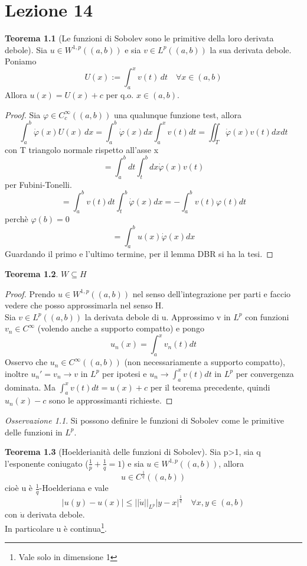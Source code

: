 \documentclass[a4paper]{book}
\theoremstyle{definition}
\theoremstyle{remark}
\newtheorem{oss}{Osservazione}
\theoremstyle{definition}
\newtheorem{teo}{Teorema}
\begin{document}
\chapter{Lezione 14}

\begin{teo}[Le funzioni di Sobolev sono le primitive della loro derivata debole]
	Sia $u\in W^ {1,p}((a,b))$ e sia $v \in L^p((a,b))$ la sua derivata debole. Poniamo $$U(x) := \int_a^x v(t)\,dt \quad \forall x \in (a,b)$$ Allora $u(x) = U(x) + c$ per q.o. $x\in (a,b)$.
\end{teo}

\begin{proof}
	Sia $\varphi \in C_c^\infty ((a,b))$ una qualunque funzione test, allora 
	$$\int_a^b \dot{\varphi}(x)U(x)\,dx = \int_a^b \dot{\varphi}(x) dx\int_a^x v(t)dt = \iint_T \dot{\varphi}(x)v(t)dxdt$$
	con T triangolo normale rispetto all'asse x
	$$ = \int_a^b dt \int_t^b dx \dot{\varphi}(x)v(t)$$ per Fubini-Tonelli.
	$$ = \int_a^bv(t)dt \int_t^b \dot{\varphi}(x)dx = - \int_a^b v(t)\varphi(t)dt$$
	perchè $\varphi(b) = 0$
	$$= \int_a^b u(x) \dot{\varphi}(x) dx$$
	Guardando il primo e l'ultimo termine, per il lemma DBR si ha la tesi.
\end{proof}

\begin{teo}
	$W \subseteq H$
\end{teo}

\begin{proof}
	Prendo $u\in W^ {1,p}((a,b))$ nel senso dell'integrazione per parti e faccio vedere che posso approssimarla nel senso H.\\
	Sia $v \in L^p((a,b))$ la derivata debole di u. Approssimo v in $L^p$ con funzioni $v_n \in C^\infty$ (volendo anche a supporto compatto) e pongo
	$$u_n(x) = \int_a^x v_n(t)dt$$
	Osservo che $u_n \in C^\infty((a,b))$ (non necessariamente a supporto compatto), inoltre $u_n' = v_n \to v$ in $L^p$ per ipotesi e $u_n \to \int_a^x v(t)dt$ in $L^p$ per convergenza dominata. Ma $\int_a^x v(t)dt = u(x) + c$ per il teorema precedente, quindi $u_n(x)-c$ sono le approssimanti richieste. 
\end{proof}

\begin{oss}
	Si possono definire le funzioni di Sobolev come le primitive delle funzioni in $L^p$.
\end{oss}

\begin{teo}[Hoelderianità delle funzioni di Sobolev]
	Sia p>1, sia q l'esponente coniugato ($\frac1p + \frac1q = 1$) e sia $u\in W^ {1,p}((a,b))$, allora $$u \in C^{\frac1q}((a,b))$$ cioè u è $\frac1q$-Hoelderiana e vale 
	$$|u(y)-u(x)| \le ||\dot{u}||_{L^p}|y-x|^{\frac1q} \quad \forall x,y \in (a,b)$$
	con $\dot{u}$ derivata debole.\\
	In particolare u è continua\footnote{Vale solo in dimensione 1}.
\end{teo}
\end{document}
